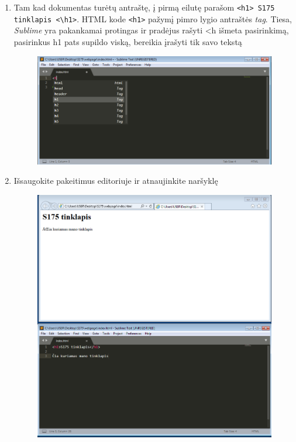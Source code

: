 \documentclass[12pt,a4paper]{article}
\begin{document}
\begin{enumerate}
\item Tam kad dokumentas turėtų antraštę, į pirmą eilutę parašom \colorbox{listinggray}{\lstinline|<h1> S175 tinklapis <\h1>|}. HTML kode \colorbox{listinggray}{\lstinline|<h1>|} pažymį pimro lygio antraštės \textit{tag}. Tiesa, \textit{Sublime} yra pakankamai protingas ir pradėjus rašyti <h išmeta pasirinkimą, pasirinkus h1 pats supildo viską, bereikia įrašyti tik savo tekstą
\begin{figure}[ht]
\center
\includegraphics[scale=0.3]{webpage_2.png}
\end{figure}

\item Išsaugokite pakeitimus editoriuje ir atnaujinkite naršyklę

\begin{figure}[ht]
\center
\includegraphics[scale=0.3]{webpage_3.png}
\end{figure}


\end{enumerate}
\end{document}
